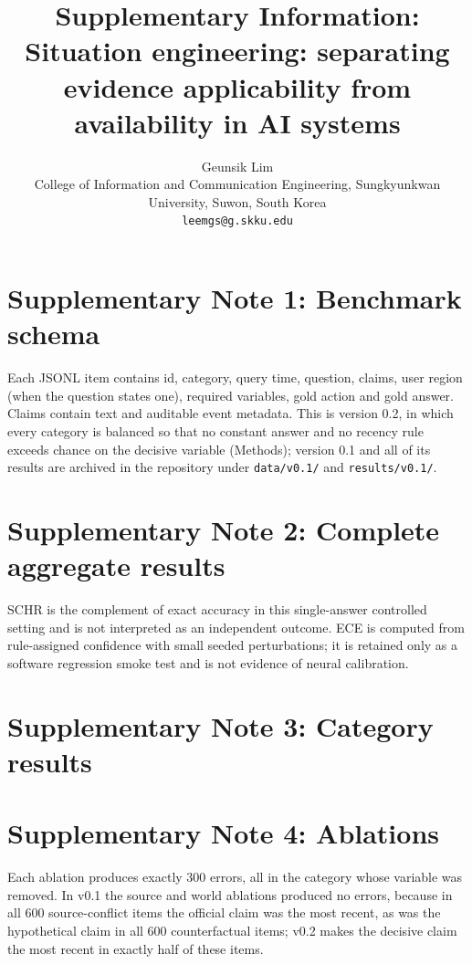 \documentclass[Numbered]{sn-jnl}
\begin{document}
\title{Supplementary Information: Situation engineering: separating evidence applicability from availability in AI systems}
\author{Geunsik Lim\\
\small College of Information and Communication Engineering,
Sungkyunkwan University, Suwon, South Korea\\
\small \texttt{leemgs@g.skku.edu}}
\maketitle

\section*{Supplementary Note 1: Benchmark schema}
Each JSONL item contains id, category, query time, question, claims, user region (when the question states one), required variables, gold action and gold answer. Claims contain text and auditable event metadata. This is version 0.2, in which every category is balanced so that no constant answer and no recency rule exceeds chance on the decisive variable (Methods); version 0.1 and all of its results are archived in the repository under \texttt{data/v0.1/} and \texttt{results/v0.1/}.

\section*{Supplementary Note 2: Complete aggregate results}

SCHR is the complement of exact accuracy in this single-answer controlled
setting and is not interpreted as an independent outcome. ECE is computed from
rule-assigned confidence with small seeded perturbations; it is retained only as
a software regression smoke test and is not evidence of neural calibration.

\section*{Supplementary Note 3: Category results}


\section*{Supplementary Note 4: Ablations}


Each ablation produces exactly 300 errors, all in the category whose variable
was removed. In v0.1 the source and world ablations produced no errors, because
in all 600 source-conflict items the official claim was the most recent, as was
the hypothetical claim in all 600 counterfactual items; v0.2 makes the decisive
claim the most recent in exactly half of these items.
\end{document}
